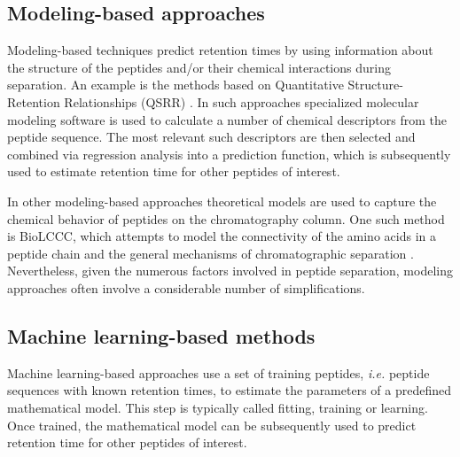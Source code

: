 \documentclass[a4paper]{article}
\begin{document}


\subsection{Modeling-based approaches}

Modeling-based techniques predict retention times by using information
about the structure of the peptides and/or their chemical interactions
during separation. An example is the methods based on Quantitative
Structure-Retention Relationships (QSRR) \cite{Kaliszan2005,
Baczek2005}. In such approaches specialized molecular modeling
software is used to calculate a number of chemical descriptors from
the peptide sequence. The most relevant such descriptors are then
selected and combined via regression analysis into a prediction
function, which is subsequently used to estimate retention time for
other peptides of interest.

In other modeling-based approaches theoretical models are used to
capture the chemical behavior of peptides on the chromatography
column. One such method is BioLCCC, which attempts to model the
connectivity of the amino acids in a peptide chain and the general
mechanisms of chromatographic
separation \cite{gorshkov2006}. Nevertheless, given the numerous
factors involved in peptide separation, modeling approaches often
involve a considerable number of simplifications.
 
\subsection{Machine learning-based methods}
\label{sec:ML}

Machine learning-based approaches use a set of training peptides, {\em
  i.e.} peptide sequences with known retention times, to estimate the
parameters of a predefined mathematical model. This step is typically
called fitting, training or learning. Once trained, the mathematical
model can be subsequently used to predict retention time for other
peptides of interest.
\end{document}

